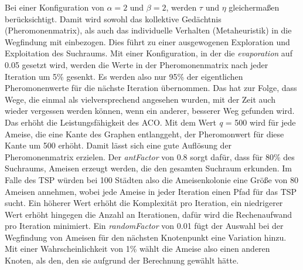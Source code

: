 Bei einer Konfiguration von $\alpha = 2$ und $\beta = 2$, werden $\tau$ und
$\eta$ gleichermaßen berücksichtigt. Damit wird sowohl das kollektive
Gedächtnis (Pheromonenmatrix), als auch das individuelle Verhalten
(Metaheuristik) in die Wegfindung mit einbezogen. Dies führt zu einer
ausgewogenen Exploration und Exploitation des Suchraums. Mit einer
Konfiguration, in der die \emph{evaporation} auf 0.05 gesetzt wird, werden
die Werte in der Pheromonenmatrix nach jeder Iteration um 5\% gesenkt. Es
werden also nur 95\% der eigentlichen Pheromonenwerte für die nächste
Iteration übernommen. Das hat zur Folge, dass Wege, die einmal als
vielversprechend angesehen wurden, mit der Zeit auch wieder vergessen werden
können, wenn ein anderer, besserer Weg gefunden wird. Das erhöht die
Leistungsfähigkeit des ACO. Mit dem Wert \emph{q} = 500 wird für jede Ameise,
die eine Kante des Graphen entlanggeht, der Pheromonwert für diese Kante um
500 erhöht. Damit lässt sich eine gute Auflösung der Pheromonenmatrix
erzielen. Der \emph{antFactor} von 0.8 sorgt dafür, dass für 80\% des
Suchraums, Ameisen erzeugt werden, die den gesamten Suchraum erkunden. Im
Falle des TSP würden bei 100 Städten also die Ameisenkolonie eine Größe von
80 Ameisen annehmen, wobei
jede Ameise in jeder Iteration einen Pfad für das TSP sucht. Ein höherer Wert
erhöht die Komplexität pro Iteration, ein niedrigerer Wert erhöht hingegen
die Anzahl an Iterationen, dafür wird die Rechenaufwand pro Iteration
minimiert.
Ein \emph{randomFactor} von 0.01 fügt der Auswahl bei der Wegfindung von
Ameisen für den nächsten Knotenpunkt eine Variation hinzu. Mit einer
Wahrscheinlichkeit von 1\% wählt die Ameise also einen anderen Knoten, als
den, den sie aufgrund der Berechnung gewählt hätte.